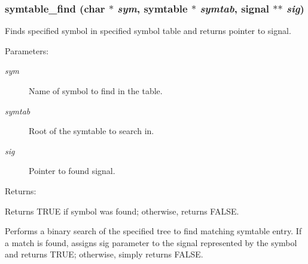 \subsubsection{ symtable\_\-find (char $\ast$ {\em sym}, {\bf symtable} $\ast$ {\em symtab}, {\bf signal} $\ast$$\ast$ {\em sig})}\label{symtable_8c_a1}


Finds specified symbol in specified symbol table and returns pointer to signal.

\begin{Desc}
\item[Parameters: ]\par
\begin{description}
\item[{\em 
sym}]Name of symbol to find in the table. \item[{\em 
symtab}]Root of the symtable to search in. \item[{\em 
sig}]Pointer to found signal.\end{description}
\end{Desc}
\begin{Desc}
\item[Returns: ]\par
Returns TRUE if symbol was found; otherwise, returns FALSE.\end{Desc}
Performs a binary search of the specified tree to find matching symtable entry. If a match is found, assigns sig parameter to the signal represented by the symbol and returns TRUE; otherwise, simply returns FALSE. 